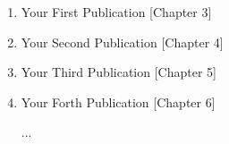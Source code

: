{}

\begin{publications}


\setlength{\parskip}{2em} 

\begin{enumerate}

\item Your First Publication [Chapter 3]
\item Your Second Publication [Chapter 4]
\item Your Third Publication [Chapter 5]
\item Your Forth Publication [Chapter 6]

...

\end{enumerate}

\end{publications}
